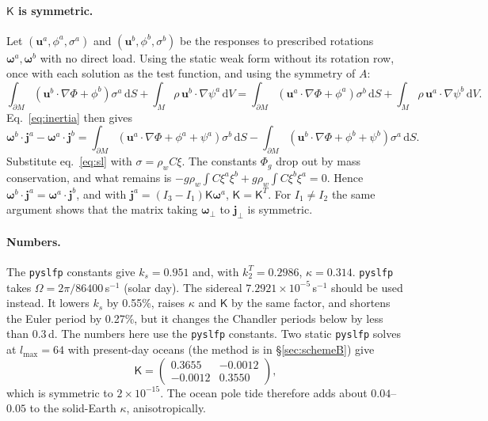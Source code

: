 \documentclass[11pt,a4paper]{article}
\newcommand{\bw}{\bm{\omega}}
\newcommand{\bu}{\mathbf{u}}
\newcommand{\bj}{\mathbf{j}}
\newcommand{\K}{\mathsf{K}}
\newcommand{\dd}{\,\mathrm{d}}
\newcommand{\pM}{\partial M}
\begin{document}
\paragraph{$\K$ is symmetric.} Let $(\bu^a,\phi^a,\sigma^a)$ and $(\bu^b,\phi^b,\sigma^b)$ be the
responses to prescribed rotations $\bw^a,\bw^b$ with no direct load. Using the static weak form
without its rotation row, once with each solution as the test function, and using the symmetry of $A$:
\begin{equation*}
  \int_{\pM}(\bu^b\!\cdot\!\nabla\Phi+\phi^b)\sigma^a\dd S+\int_M\rho\,\bu^b\!\cdot\!\nabla\psi^a\dd V
  =\int_{\pM}(\bu^a\!\cdot\!\nabla\Phi+\phi^a)\sigma^b\dd S+\int_M\rho\,\bu^a\!\cdot\!\nabla\psi^b\dd V .
\end{equation*}
Eq.~\eqref{eq:inertia} then gives
\begin{equation*}
  \bw^b\cdot\bj^a-\bw^a\cdot\bj^b
  =\int_{\pM}(\bu^a\!\cdot\!\nabla\Phi+\phi^a+\psi^a)\sigma^b\dd S-\int_{\pM}(\bu^b\!\cdot\!\nabla\Phi+\phi^b+\psi^b)\sigma^a\dd S .
\end{equation*}
Substitute eq.~\eqref{eq:sl} with $\sigma=\rho_wC\xi$. The constants $\Phi_g$ drop out by mass conservation,
and what remains is $-g\rho_w\int C\xi^a\xi^b+g\rho_w\int C\xi^b\xi^a=0$. Hence
$\bw^b\cdot\bj^a=\bw^a\cdot\bj^b$, and with $\bj^a=(I_3-I_1)\K\bw^a$, $\K=\K^T$. For
$I_1\neq I_2$ the same argument shows that the matrix taking $\bw_\perp$ to $\bj_\perp$ is symmetric.

\paragraph{Numbers.} The \texttt{pyslfp} constants give $k_s=0.951$ and, with $k^T_2=0.2986$,
$\kappa=0.314$. \texttt{pyslfp} takes $\Omega=2\pi/86400$\,s$^{-1}$ (solar day). The sidereal
$7.2921\times10^{-5}$\,s$^{-1}$ should be used instead. It lowers $k_s$ by 0.55\%, raises $\kappa$
and $\K$ by the same factor, and shortens the Euler period by 0.27\%, but it changes the Chandler
periods below by less than 0.3\,d. The numbers here use the \texttt{pyslfp} constants. Two static \texttt{pyslfp} solves at $l_{\max}=64$ with
present-day oceans (the method is in \S\ref{sec:schemeB}) give
\begin{equation}
  \K=\begin{pmatrix}0.3655&-0.0012\\-0.0012&0.3550\end{pmatrix},
  \label{eq:Knum}
\end{equation}
which is symmetric to $2\times10^{-15}$. The ocean pole tide therefore adds about $0.04$--$0.05$ to
the solid-Earth $\kappa$, anisotropically.
\end{document}
